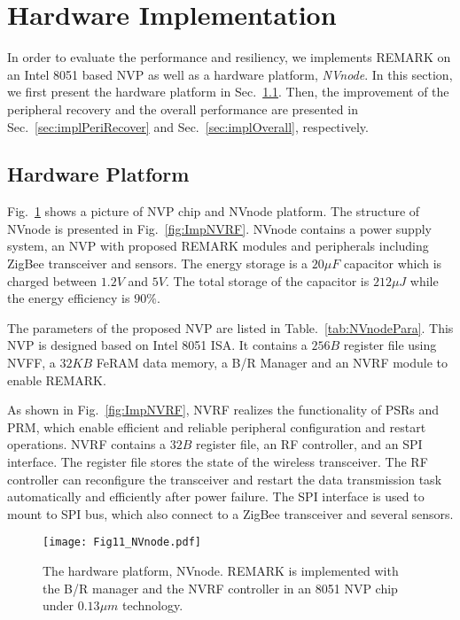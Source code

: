 \section{Hardware Implementation} \label{sec:implementation}
%
In order to evaluate the performance and resiliency, we implements REMARK on an Intel 8051 based NVP as well as a hardware platform, \emph{NVnode}.
In this section, we first present the hardware platform in Sec.~\ref{sec:implHW}. 
Then, the improvement of the peripheral recovery and the overall performance are presented in Sec.~\ref{sec:implPeriRecover} and Sec.~\ref{sec:implOverall}, respectively. 

\subsection{Hardware Platform} \label{sec:implHW}
Fig.~\ref{fig:NVnode} shows a picture of NVP chip and NVnode platform.
The structure of NVnode is presented in Fig.~\ref{fig:ImpNVRF}.
NVnode contains a power supply system, an NVP with proposed REMARK modules and peripherals including ZigBee transceiver and sensors.
The energy storage is a $20\mu F$ capacitor which is charged between $1.2V$ and $5V$.
The total storage of the capacitor is $212\mu J$ while the energy efficiency is $90\%$.

The parameters of the proposed NVP are listed in Table.~\ref{tab:NVnodePara}.
This NVP is designed based on Intel 8051 ISA. 
It contains a $256B$ register file using NVFF, a $32KB$ FeRAM data memory, a B/R Manager and an NVRF module to enable REMARK.

As shown in Fig.~\ref{fig:ImpNVRF}, NVRF realizes the functionality of PSRs and PRM, which enable efficient and reliable peripheral configuration and restart operations.
NVRF contains a $32B$ register file, an RF controller, and an SPI interface.
The register file stores the state of the wireless transceiver.
The RF controller can reconfigure the transceiver and restart the data transmission task automatically and efficiently after power failure.
The SPI interface is used to mount to SPI bus, which also connect to a ZigBee transceiver and several sensors.

%
\begin{figure}[t]
    \centering
    \texttt{[image: Fig11\_NVnode.pdf]}
    \caption{The hardware platform, NVnode. REMARK is implemented with the B/R manager and the NVRF controller in an 8051 NVP chip under $0.13\mu m$ technology.}
    \label{fig:NVnode}
\end{figure}

